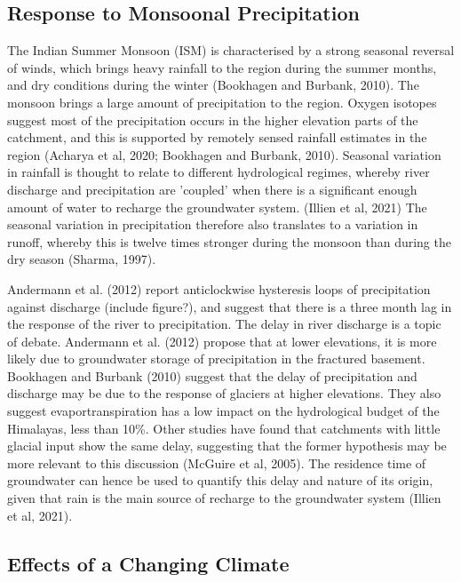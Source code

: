 \subsection{Response to Monsoonal Precipitation}

The Indian Summer Monsoon (ISM) is characterised by a strong seasonal reversal of winds, which brings heavy rainfall to the region during the summer months, and dry conditions during the winter (Bookhagen and Burbank, 2010). The monsoon brings a large amount of precipitation to the region. Oxygen isotopes suggest most of the precipitation occurs in the higher elevation parts of the catchment, and this is supported by remotely sensed rainfall estimates in the region (Acharya et al, 2020; Bookhagen and Burbank, 2010). Seasonal variation in rainfall is thought to relate to different hydrological regimes, whereby river discharge and precipitation are 'coupled' when there is a significant enough amount of water to recharge the groundwater system. (Illien et al, 2021) The seasonal variation in precipitation therefore also translates to a variation in runoff, whereby this is twelve times stronger during the monsoon than during the dry season (Sharma, 1997). 

\bsk

Andermann et al. (2012) report anticlockwise hysteresis loops of precipitation against discharge (include figure?), and suggest that there is a three month lag in the response of the river to precipitation.  The delay in river discharge is a topic of debate. Andermann et al. (2012) propose that at lower elevations, it is more likely due to groundwater storage of precipitation in the fractured basement. Bookhagen and Burbank (2010) suggest that the delay of precipitation and discharge may be due to the response of glaciers at higher elevations. They also suggest evaportranspiration has a low impact on the hydrological budget of the Himalayas, less than 10\%. Other studies have found that catchments with little glacial input show the same delay, suggesting that the former hypothesis may be more relevant to this discussion (McGuire et al, 2005). The residence time of groundwater can hence be used to quantify this delay and nature of its origin, given that rain is the main source of recharge to the groundwater system (Illien et al, 2021). 


\subsection{Effects of a Changing Climate}

